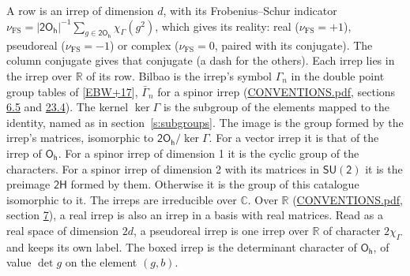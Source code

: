 \documentclass[10pt,a4paper]{article}
\numberwithin{equation}{section}
\newcommand{\grp}[1]{\mathsf{#1}}
\newcommand{\irchar}[1]{\chi_{#1}}
\newcommand{\fsind}{\nu_{\mathrm{FS}}}
\begin{document}
\leavevmode\label{n:index.frobenius}\label{n:head.irrep}\label{n:head.reality}A row is an irrep of dimension $d$, with its Frobenius--Schur indicator $\fsind = |\grp{2O_{h}}|^{-1}\allowbreak\sum_{g\in\grp{2O_{h}}}\irchar{\Gamma}(g^2)$, which gives its reality: real ($\fsind = +1$), pseudoreal ($\fsind = -1$) or complex ($\fsind = 0$, paired with its conjugate). \label{n:head.conjugate}The column conjugate gives that conjugate (a dash for the others). \label{n:head.over.real}Each irrep lies in the irrep over $\mathbb{R}$ of its row. \label{n:head.bilbao}\label{n:irrep.alias.gamma}Bilbao is the irrep's symbol $\Gamma_n$ in the double point group tables of [\href{../../../REFERENCES.pdf\#ref.EBW+17}{EBW+17}], $\bar{\Gamma}_n$ for a spinor irrep (\href{../../CONVENTIONS.pdf}{CONVENTIONS.pdf}, sections \href{../../../rotation/CONVENTIONS.pdf\#conv.6.5}{6.5} and \href{../../CONVENTIONS.pdf\#conv.23.4}{23.4}). \label{n:head.kernel}The kernel $\ker\Gamma$ is the subgroup of the elements mapped to the identity, named as in section~\ref{s:subgroups}. \label{n:head.image}The image is the group formed by the irrep's matrices, isomorphic to $\grp{2O_{h}}/\ker\Gamma$. For a vector irrep it is that of the irrep of \href{../../../rotation/data/pdf/Oh.pdf}{$\grp{O_{h}}$}. For a spinor irrep of dimension 1 it is the cyclic group of the characters. For a spinor irrep of dimension 2 with its matrices in $\grp{SU(2)}$ it is the preimage $\grp{2H}$ formed by them. Otherwise it is the group of this catalogue isomorphic to it. The irreps are irreducible over $\mathbb{C}$. Over $\mathbb{R}$ (\href{../../CONVENTIONS.pdf}{CONVENTIONS.pdf}, section \href{../../../rotation/CONVENTIONS.pdf\#conv.7}{7}), a real irrep is also an irrep in a basis with real matrices. Read as a real space of dimension $2d$, a pseudoreal irrep is one irrep over $\mathbb{R}$ of character $2\irchar{\Gamma}$ and keeps its own label. \label{n:mark.determinant}The boxed irrep is the determinant character of \href{../../../rotation/data/pdf/Oh.pdf}{$\grp{O_{h}}$}, of value $\det g$ on the element $(g, b)$.
\setlength{\emergencystretch}{2em}\par\setlength{\emergencystretch}{0pt}
\end{document}
